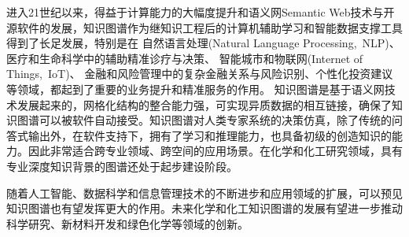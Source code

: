 进入21世纪以来，得益于计算能力的大幅度提升和语义网\textrm{Semantic Web}技术与开源软件的发展，知识图谱作为继知识工程后的计算机辅助学习和智能数据支撑工具得到了长足发展，特别是在%
自然语言处理\textrm{(Natural Language Processing,~NLP)}、%
医疗和生命科学中的辅助精准诊疗与决策、%
智能城市和物联网\textrm{(Internet of Things,~IoT)}、%
金融和风险管理中的复杂金融关系与风险识别、个性化投资建议等领域，都起到了重要的业务提升和精准服务的作用。%
知识图谱是基于语义网技术发展起来的，网格化结构的整合能力强，可实现异质数据的相互链接，确保了知识图谱可以被软件自动接受。知识图谱对人类专家系统的决策仿真，除了传统的问答式输出外，在软件支持下，拥有了学习和推理能力，也具备初级的创造知识的能力。因此非常适合跨专业领域、跨空间的应用场景。在化学和化工研究领域，具有专业深度知识背景的图谱还处于起步建设阶段。%

随着人工智能、数据科学和信息管理技术的不断进步和应用领域的扩展，可以预见知识图谱也有望发挥更大的作用。未来化学和化工知识图谱的发展有望进一步推动科学研究、新材料开发和绿色化学等领域的创新。

